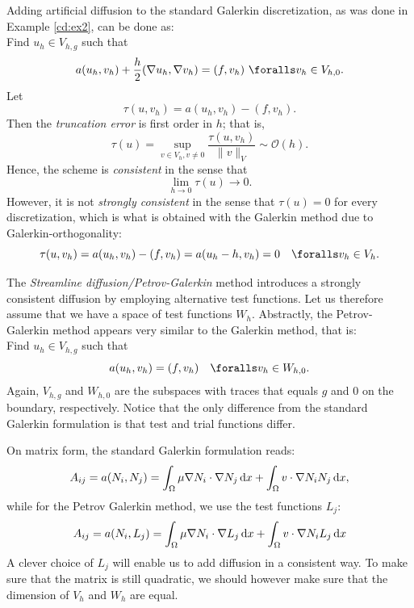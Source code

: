 Adding artificial diffusion 
to the standard Galerkin discretization, 
as was done in Example \ref{cd:ex2}, 
can be done as: \\ 
Find $u_h\in V_{h,g}$ such that 
\[
a(u_h, v_h) + \frac{h}{2}(\nabla u_h, \nabla v_h)  = (f,v_h)\ \foralls v_h\in V_{h,0}.
\]
Let
\[
\tau(u, v_h) =  a(u_h, v_h) - (f,v_h). 
\]
Then the \emph{truncation error} is first order in $h$; that is, 
\[
\tau(u) = \sup_{v \in V_h, v \not = 0} \frac{\tau (u, v_h)}{\|v\|_{V}} \sim \mathcal{O}(h). 
\]
Hence, the scheme is \emph{consistent} in the sense that 
\[
\lim_{h\rightarrow 0} \tau (u) \rightarrow 0 .  
\]
However, it is not \emph{strongly consistent} in the sense that $\tau(u) = 0$ for every
discretization, which is what is obtained with the Galerkin method due
to Galerkin-orthogonality:   
\[
\tau(u, v_h) =  a(u_h, v_h) - (f,v_h) = a(u_h - h, v_h) = 0 \quad \foralls v_h \in V_h. 
\]


The \textit{Streamline diffusion/Petrov-Galerkin} method introduces a strongly consistent  
diffusion by employing alternative test functions. Let us therefore
assume that we have a space of test functions $W_h$.   
Abstractly, the Petrov-Galerkin method appears very similar to the Galerkin method, that is: \\ 
Find $u_h\in V_{h,g}$ such that 
\[
a(u_h, v_h) = (f,v_h) \quad \foralls v_h\in W_{h,0}.
\]
Again, $V_{h,g}$  and $W_{h,0}$ are the subspaces with traces that equals $g$ and $0$ on 
the boundary, respectively.  
Notice that the only difference from the standard Galerkin formulation is that test and trial functions differ. 

On matrix form, the standard Galerkin formulation reads: 
\begin{equation}
A_{ij} = a(N_i, N_j ) = \int_\Omega\mu\nabla N_i \cdot \nabla N_j \, \mathrm{d}x + \int_\Omega v \cdot \nabla N_iN_j \, \mathrm{d}x, 
\label{eq:wGalerkin_A}
\end{equation}
while for the Petrov Galerkin method, we use the test functions $L_j$: 
\[A_{ij} = a(N_i, L_j ) = \int_\Omega\mu\nabla N_i \cdot \nabla L_j \, \mathrm{d}x + \int_\Omega v \cdot \nabla N_iL_j \, \mathrm{d}x\]
A clever choice of $L_j$ will enable us to add diffusion in a consistent way. To make sure
that the matrix is still quadratic, we should however make sure that the dimension of 
$V_h$ and $W_h$ are equal. 

